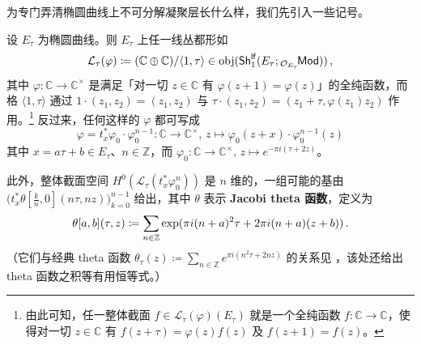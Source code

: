 
为专门弄清椭圆曲线上不可分解凝聚层长什么样，我们先引入一些记号。

\begin{Pro}\label{linebundleonell}
	设 $E_\tau$ 为椭圆曲线。则 $E_\tau$ 上任一线丛都形如
	\begin{equation}
		\mathcal{L}_\tau(\varphi)\coloneqq(\mathbb{C}\oplus\mathbb{C})/\langle1,\tau\rangle\in\textup{obj}(\mathsf{Sh}^\mathsf{lf}_1(E_\tau;{}_{\mathcal{O}_{E_\tau}}\!\mathsf{Mod}))\,,
	\end{equation}
	其中 $\varphi:\mathbb{C}\rightarrow\mathbb{C}^\times$ 是满足「对一切 $z\in\mathbb{C}$ 有 $\varphi(z+1)=\varphi(z)$」的全纯函数，而格 $\langle 1,\tau\rangle$ 通过 $1\cdot(z_1,z_2)=(z_1,z_2)$ 与 $\tau\cdot(z_1,z_2)=(z_1+\tau,\varphi(z_1)z_2)$ 作用。\footnote{由此可知，任一整体截面 $f\in\mathcal{L}_\tau(\varphi)(E_\tau)$ 就是一个全纯函数 $f:\mathbb{C}\rightarrow\mathbb{C}$，使得对一切 $z\in\mathbb{C}$ 有 $f(z+\tau)=\varphi(z)f(z)$ 及 $f(z+1)=f(z)$。} 反过来，任何这样的 $\varphi$ 都可写成
	\[
	\varphi=t_x^*\varphi_0\cdot\varphi_0^{n-1}:\mathbb{C}\rightarrow\mathbb{C}^\times,\,z\mapsto\varphi_0(z+x)\cdot\varphi_0^{n-1}(z)
	\]
	其中 $x=a\tau+b\in E_\tau$、$n\in\mathbb{Z}$，而 $\varphi_0:\mathbb{C}\rightarrow\mathbb{C}^\times,\,z\mapsto e^{-\pi i(\tau+2z)}$。

	此外，整体截面空间 $H^0(\mathcal{L}_\tau(t_x^*\varphi_0^n))$ 是 $n$ 维的，一组可能的基由 $\big(t_x^*\theta[\frac{k}{n},0](n\tau,nz)\big)_{k=0}^{n-1}$ 给出，其中 $\theta$ 表示 \textbf{Jacobi theta 函数}，定义为
	\begin{equation}
		\theta[a,b](\tau,z)\coloneqq\sum_{n\in\mathbb{Z}}\textup{exp}(\pi i(n+a)^2\tau + 2\pi i(n+a)(z+b))\,.
	\end{equation}
	（它们与经典 theta 函数 $\theta_\tau(z)\coloneqq\sum_{n\in\mathbb{Z}}e^{\pi i(n^2\tau+2nz)}$ 的关系见 \textup{\cite[第 4.1 节]{[Por15]}}，该处还给出 theta 函数之积等有用恒等式。）
\end{Pro}


